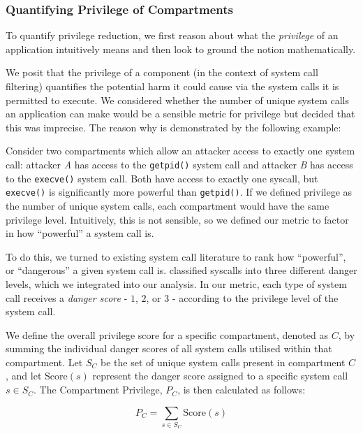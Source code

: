 \subsubsection{Quantifying Privilege of
Compartments}\label{subsubsec:eval-quant-privilege}

To quantify privilege reduction, we first reason about what the 
\textit{privilege} of an application intuitively means and then look to ground
the notion mathematically.

We posit that the privilege of a component (in the context of system call
filtering) quantifies the potential harm it could cause via the system calls
it is permitted to execute. We considered whether the number of unique
system calls an application can make would be a sensible metric for privilege
but decided that this was imprecise. The reason why is
demonstrated by the following example:  

Consider two compartments which allow an attacker access to
exactly one system call: attacker \textit{A} has access to the 
\texttt{getpid()} system call and attacker \textit{B} has access to the
\texttt{execve()} system call. Both have access to exactly one syscall, but
\texttt{execve()} is significantly more powerful than \texttt{getpid()}.
If we defined privilege as the number of unique system calls, each compartment
would have the same privilege level. Intuitively, this is not sensible, so we
defined our metric to factor in how ``powerful'' a system call is. 

To do this, we turned to existing system call literature to rank
how ``powerful'', or ``dangerous'' a given system call is. 
\textcite{SYSCALL_RANKINGS} classified syscalls into three different danger
levels, which we integrated into our analysis. In our metric, each   type of
system call receives a \textit{danger score} - $1$, $2$, or $3$ - according
to the privilege level of the system call.

We define the overall privilege score for a specific compartment, denoted as
$C$, by summing the individual danger scores of all system calls utilised
within that compartment. Let $S_C$ be the set of unique system calls present
in compartment $C$, and let $\mathrm{Score}(s)$ represent the danger score
assigned to a specific system call $s \in S_C$. The Compartment Privilege, $P_C
$, is then calculated as follows:  

\begin{equation} \label{eqn:privilege} 
    P_C = \sum_{s \in S_C} \mathrm{Score}(s) 
\end{equation} 


